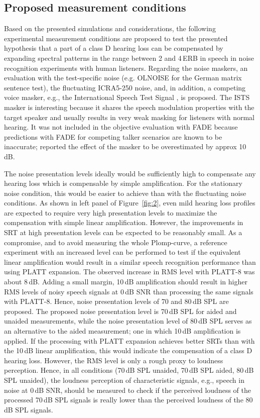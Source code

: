 \documentclass[10pt,a4paper,twocolumn]{article}
\begin{document}
\subsection*{Proposed measurement conditions}
%
Based on the presented simulations and considerations, the following experimental measurement conditions are proposed to test the presented hypothesis that a part of a class D hearing loss can be compensated by expanding spectral patterns in the range between 2 and 4\,ERB in speech in noise recognition experiments with human listeners.
%
Regarding the noise maskers, an evaluation with the test-specific noise (e.g. OLNOISE for the German matrix sentence test), the fluctuating ICRA5-250 noise, and, in addition, a competing voice masker, e.g., the International Speech Test Signal \citep[ISTS;][]{holube2010}, is proposed.
%
The ISTS masker is interesting because it shares the speech modulation properties with the target speaker and usually results in very weak masking for listeners with normal hearing.
%
It was not included in the objective evaluation with FADE because predictions with FADE for competing talker scenarios are known to be inaccurate; \cite{schaedler2018} reported the effect of the masker to be overestimated by approx 10\,dB.

The noise presentation levels ideally would be sufficiently high to compensate any hearing loss which is compensable by simple amplification.
%
For the stationary noise condition, this would be easier to achieve than with the fluctuating noise conditions.
%
As shown in left panel of Figure~\ref{fig:2}, even mild hearing loss profiles are expected to require very high presentation levels to maximize the compensation with simple linear amplification.
%
However, the improvements in SRT at high presentation levels can be expected to be reasonably small.
%
As a compromise, and to avoid measuring the whole Plomp-curve, a reference experiment with an increased level can be performed to test if the equivalent linear amplification would result in a similar speech recognition performance than using PLATT expansion.
%
The observed increase in RMS level with PLATT-8 was about 8\,dB.
%
Adding a small margin, 10\,dB amplification should result in higher RMS levels of noisy speech signals at 0\,dB SNR than processing the same signals with PLATT-8.
%
Hence, noise presentation levels of 70 and 80\,dB SPL are proposed.
%
The proposed noise presentation level is 70\,dB SPL for aided and unaided measurements, while the noise presentation level of 80\,dB SPL serves as an alternative to the aided measurement; one in which 10\,dB amplification is applied.
%
If the processing with PLATT expansion achieves better SRTs than with the 10\,dB linear amplification, this would indicate the compensation of a class D hearing loss.
%
However, the RMS level is only a rough proxy to loudness perception.
%
Hence, in all conditions (70\,dB SPL unaided, 70\,dB SPL aided, 80\,dB SPL unaided), the loudness perception of characteristic signals, e.g., speech in noise at 0\,dB SNR, should be measured to check if the perceived loudness of the processed 70\,dB SPL signals is really lower than the perceived loudness of the 80\,dB SPL signals.
\end{document}
